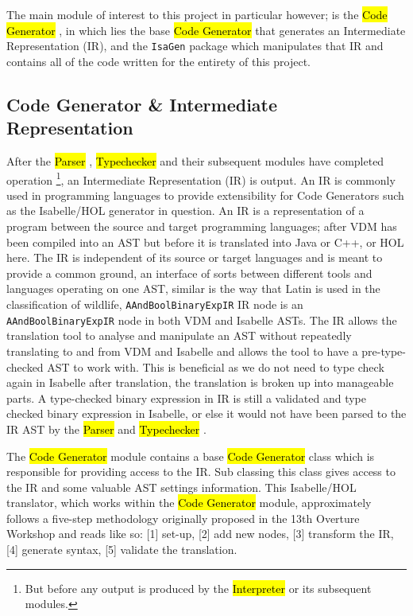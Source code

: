 The main module of interest to this project in particular however; is the \ttfamily\hl{Code Generator} \rmfamily, in which lies the base \ttfamily\hl{Code Generator} \rmfamily that generates an Intermediate Representation (IR), and the \lstinline[language=Java]{IsaGen} package which manipulates that IR and contains all of the code written for the entirety of this project.

\subsection{Code Generator \& Intermediate Representation} \label{cgair}
After the \ttfamily\hl{Parser} \rmfamily, \ttfamily\hl{Typechecker} \rmfamily and their subsequent modules have completed operation \footnote{But before any output is produced by the \ttfamily\hl{Interpreter} \rmfamily or its subsequent modules.}, an Intermediate Representation (IR) is output. An IR is commonly used in programming languages to provide extensibility for Code Generators such as the Isabelle/HOL generator in question. An IR is a representation of a program between the source and target programming languages; after VDM has been compiled into an AST but before it is translated into Java or C++, or HOL here. The IR is independent of its source or target languages and is meant to provide a common ground, an interface of sorts between different tools and languages operating on one AST, similar is the way that Latin is used in the classification of wildlife, \lstinline[language=Java]{AAndBoolBinaryExpIR} IR node is an \lstinline[language=Java]{AAndBoolBinaryExpIR} node in both VDM and Isabelle ASTs. The IR allows the translation tool to analyse and manipulate an AST without repeatedly translating to and from VDM and Isabelle and allows the tool to have a pre-type-checked AST to work with. This is beneficial as we do not need to type check again in Isabelle after translation, the translation is broken up into manageable parts. A type-checked binary expression in IR is still a validated and type checked binary expression in Isabelle, or else it would not have been parsed to the IR AST by the \ttfamily\hl{Parser} \rmfamily and \ttfamily\hl{Typechecker} \rmfamily.

The \ttfamily\hl{Code Generator} \rmfamily module contains a base \ttfamily\hl{Code Generator} \rmfamily class which is responsible for providing access to the IR. Sub classing this class gives access to the IR and some valuable AST settings information. This Isabelle/HOL translator, which works within the \ttfamily\hl{Code Generator} \rmfamily module, approximately follows a five-step methodology originally proposed in the 13th Overture Workshop\parencite{overtureproceedings} and reads like so: [1] set-up, [2] add new nodes, [3] transform the IR, [4] generate syntax, [5] validate the translation.  


